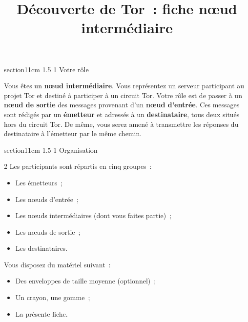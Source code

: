 \documentclass[a4paper,twoside,french]{article}
\makeatletter
\renewcommand\section{\@startsection
  {section}{1}{1cm}%
  {1.5\baselineskip}%
  {1\baselineskip}%
  {\normalfont\Large\bfseries}}%
\makeatother
\begin{document}
  
  \title{Découverte de Tor~: fiche \og n\oe ud intermédiaire\fg}
  \date{}

  \maketitle
  \pagestyle{empty}
  \thispagestyle{empty}

  \section{Votre rôle}

  Vous êtes un \textbf{n\oe ud intermédiaire}. Vous représentez un
  serveur participant au projet Tor et destiné à participer à un
  circuit Tor. Votre rôle est de passer à un \textbf{n\oe ud de sortie}
  des messages provenant d'un \textbf{n\oe ud d'entrée}. Ces messages
  sont rédigés par un \textbf{émetteur} et adressés à un
  \textbf{destinataire}, tous deux situés hors du circuit Tor. De
  même, vous serez amené à transmettre les réponses du destinataire à
  l'émetteur par le même chemin.
  
  \section{Organisation}

  \begin{multicols}{2}
    Les participants sont répartis en cinq groupes~:
    \begin{itemize}
    \item Les émetteurs~;
    \item Les n\oe uds d'entrée~;
    \item Les n\oe uds intermédiaires (dont vous faites partie)~;
    \item Les n\oe uds de sortie~;
    \item Les destinataires.
    \end{itemize}
    \vfill\columnbreak

    Vous disposez du matériel suivant~:
    \begin{itemize}
    \item Des enveloppes de taille moyenne (optionnel)~;
    \item Un crayon, une gomme~;
    \item La présente fiche.
    \end{itemize}
  \end{multicols}
\end{document}
